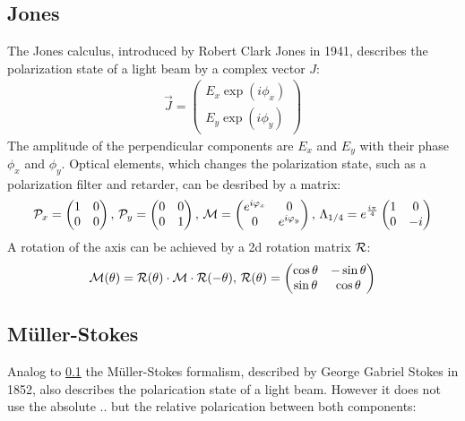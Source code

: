\subsection{Jones}
\label{sec:jones}
% 
The Jones calculus, introduced by Robert Clark Jones in 1941, describes the polarization state of a light beam by a complex vector $J$:
% 
\begin{align}
    \vec{J} = \begin{pmatrix} E_x \exp(i \phi_x) \\ E_y \exp(i \phi_y) \end{pmatrix}
\end{align}
% 
The amplitude of the perpendicular components are $E_x$ and $E_y$ with their phase $\phi_x$ and $\phi_y$.
Optical elements, which changes the polarization state, such as a polarization filter and retarder, can be desribed by a matrix:
% 
\begin{align}
\begin{split}
\mathcal{P}_x = 
\begin{pmatrix}
1 & 0 \\ 0 & 0
\end{pmatrix}
, \,
\mathcal{P}_y = 
\begin{pmatrix}
0 & 0 \\ 0 & 1
\end{pmatrix}
, \,
\mathcal{M} =
\begin{pmatrix}
e^{i \varphi_x} & 0 \\ 0 & e^{i \varphi_y}
\end{pmatrix}
, \,
\Lambda_{1/4}=
e^{\frac{i \pi}{4}}
\begin{pmatrix}
1 & 0 \\ 0 & -i
\end{pmatrix}
\end{split}
\end{align}
% 
A rotation of the axis can be achieved by a 2d rotation matrix $\mathcal{R}$:
% 
\begin{align}
\begin{split}
\mathcal{M}(\theta )=\mathcal{R}(\theta )\cdot\mathcal{M}\cdot\mathcal{R}(-\theta )
, \,
\mathcal{R}(\theta ) = 
\begin{pmatrix}
\cos \theta & -\sin \theta \\
\sin \theta & \cos \theta
\end{pmatrix}
\end{split}
\end{align}
% 
% 
% 
\subsection{M\"uller-Stokes}\label{sec:Mueller-Stokes}
\label{sec:mueller_stokes}
% 
Analog to \cref{sec:jones} the M\"uller-Stokes formalism, described by George Gabriel Stokes in 1852, also describes the polarication state of a light beam.
However it does not use the absolute .. but the relative polarication between both components:
% 
